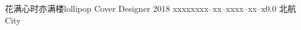 \documentclass{tstextbook}
\begin{document}
       {花满心时亦满楼lollipop}
       {Cover Designer}
       {2018}
       {xxxxx}{xxx--xx--xxxx--xx--x}{0.0}
       {北航}
       {City}













\printbibliography{}


\printindex
\end{document}
